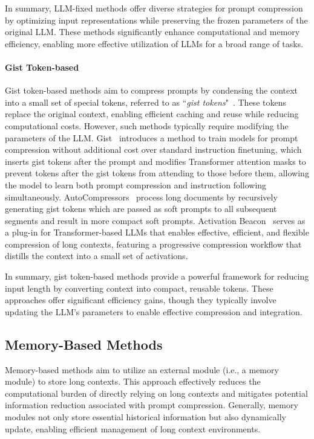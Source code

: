 \documentclass[11pt, a4paper, logo, copyright, nonumbering]{map}
\begin{document}
In summary, LLM-fixed methods offer diverse strategies for prompt compression by optimizing input representations while preserving the frozen parameters of the original LLM. These methods significantly enhance computational and memory efficiency, enabling more effective utilization of LLMs for a broad range of tasks.

\paragraph{Gist Token-based}
Gist token-based methods aim to compress prompts by condensing the context into a small set of special tokens, referred to as ``\textit{gist tokens}"~\cite{NEURIPS2023_3d77c6dc}. These tokens replace the original context, enabling efficient caching and reuse while reducing computational costs.
However, such methods typically require modifying the parameters of the LLM. 
Gist~\cite{NEURIPS2023_3d77c6dc} introduces a method to train models for prompt compression without additional cost over standard instruction finetuning, which inserts gist tokens after the prompt and modifies Transformer attention masks to prevent tokens after the gist tokens from attending to those before them, allowing the model to learn both prompt compression and instruction following simultaneously. 
AutoCompressors~\cite{chevalier-etal-2023-adapting} process long documents by recursively generating gist tokens which are passed as soft prompts to all subsequent segments and result in more compact soft prompts. Activation Beacon~\cite{zhang2025long} serves as a plug-in for Transformer-based LLMs that enables effective, efficient, and flexible compression of long contexts, featuring a progressive compression workflow that distills the context into a small set of activations.

In summary, gist token-based methods provide a powerful framework for reducing input length by converting context into compact, reusable tokens. These approaches offer significant efficiency gains, though they typically involve updating the LLM’s parameters to enable effective compression and integration.


\subsection{Memory-Based Methods}
\label{sec:memory_based_methods}
Memory-based methods aim to utilize an external module (i.e., a memory module) to store long contexts. This approach effectively reduces the computational burden of directly relying on long contexts and mitigates potential information reduction associated with prompt compression. Generally, memory modules not only store essential historical information but also dynamically update, enabling efficient management of long context environments.
\end{document}
